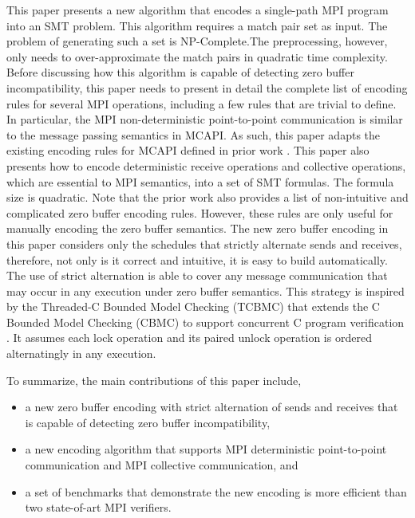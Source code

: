 This paper presents a new algorithm that encodes a single-path MPI program into an SMT problem. This algorithm requires a match pair set as input. The problem of generating such a set is NP-Complete.The preprocessing, however, only needs to over-approximate the match pairs in quadratic time complexity. Before discussing how this algorithm is capable of detecting zero buffer incompatibility, this paper needs to present in detail the complete list of encoding rules for several MPI operations, including a few rules that are trivial to define.  In particular, the MPI non-deterministic point-to-point communication is similar to the message passing semantics in MCAPI. As such, this paper adapts the existing encoding rules for MCAPI defined in prior work \cite{DBLP:conf/kbse/HuangMM13}. This paper also presents how to encode deterministic receive operations and collective operations, which are essential to MPI semantics, into a set of SMT formulas. The formula size is quadratic. Note that the prior work also provides a list of non-intuitive and complicated zero buffer encoding rules. However, these rules are only useful for manually encoding the zero buffer semantics. The new zero buffer encoding in this paper considers only the schedules that strictly alternate sends and receives, therefore, not only is it correct and intuitive, it is easy to build automatically. The use of strict alternation is able to cover any message communication that may occur in any execution under zero buffer semantics. This strategy is inspired by the Threaded-C Bounded Model Checking (TCBMC) that extends the C Bounded Model Checking (CBMC) \cite{DBLP:conf/tacas/ClarkeKL04,DBLP:conf/dac/ClarkeKY03} to support concurrent C program verification \cite{DBLP:conf/cav/RabinovitzG05}. It assumes each lock operation and its paired unlock operation is ordered alternatingly in any execution. 

To summarize, the main contributions of this paper include,
\begin{itemize}
\item a new zero buffer encoding with strict alternation of sends and receives that is capable of detecting zero buffer incompatibility, 
\item a new encoding algorithm that supports MPI deterministic point-to-point communication and MPI collective communication, and
\item a set of benchmarks that demonstrate the new encoding is more efficient than two state-of-art MPI verifiers.
\end{itemize}


